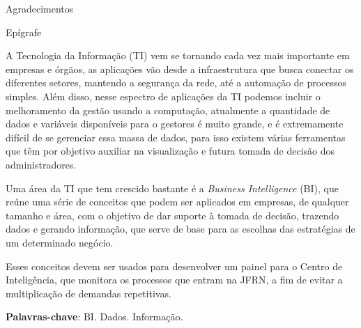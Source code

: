 \documentclass[
    12pt,				%
	oneside,            %
	a4paper,			%
	english,			%
	french,
	spanish,
	brazil				%
	]{abntex2}
\begin{document}
\begin{agradecimentos}
Agradecimentos
\end{agradecimentos}

\begin{epigrafe}
    \vspace*{\fill}
	\begin{flushright}
		Epígrafe
	\end{flushright}
\end{epigrafe}

\setlength{\absparsep}{18pt} %
\begin{resumo}
\vspace{\onelineskip}

A Tecnologia da Informação (TI) vem se tornando cada vez mais importante em empresas e órgãos, as aplicações vão desde a infraestrutura que busca conectar os diferentes setores, mantendo a segurança da rede, até a automação de processos simples. Além disso, nesse espectro de aplicações da TI podemos incluir o melhoramento da gestão usando a computação, atualmente a quantidade de dados e variáveis disponíveis para o gestores é muito grande, e é extremamente difícil de se gerenciar essa massa de dados, para isso existem várias ferramentas que têm por objetivo auxiliar na visualização e futura tomada de decisão dos administradores.

Uma área da TI que tem crescido bastante é a \textit{Business Intelligence} (BI), que reúne uma série de conceitos que podem ser aplicados em empresas, de qualquer tamanho e área, com o objetivo de dar suporte à tomada de decisão, trazendo dados e gerando informação, que serve de base para as escolhas das estratégias de um determinado negócio.  

Esses conceitos devem ser usados para desenvolver um painel para o Centro de Inteligência, que monitora os processos que entram na JFRN, a fim de evitar a multiplicação de demandas repetitivas.

\noindent\textbf{Palavras-chave}: BI. Dados. Informação.
\end{resumo}
\end{document}
